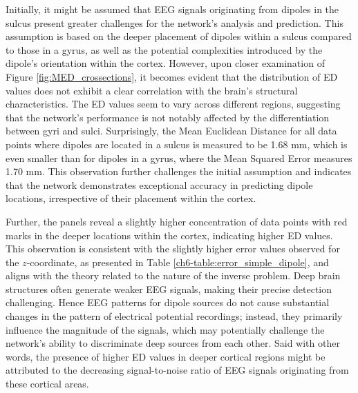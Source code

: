 \documentclass[a4paper, UKenglish, 11pt]{uiomaster}
\begin{document}
Initially, it might be assumed that EEG signals originating from dipoles in the sulcus present greater challenges for the network's analysis and prediction. This assumption is based on the deeper placement of dipoles within a sulcus compared to those in a gyrus, as well as the potential complexities introduced by the dipole's orientation within the cortex. However, upon closer examination of Figure \ref{fig:MED_crossections}, it becomes evident that the distribution of ED values does not exhibit a clear correlation with the brain's structural characteristics. The ED values seem to vary across different regions, suggesting that the network's performance is not notably affected by the differentiation between gyri and sulci. Surprisingly, the Mean Euclidean Distance for all data points where dipoles are located in a sulcus is measured to be 1.68 mm, which is even smaller than for dipoles in a gyrus, where the Mean Squared Error measures 1.70 mm. This observation further challenges the initial assumption and indicates that the network demonstrates exceptional accuracy in predicting dipole locations, irrespective of their placement within the cortex.


Further, the panels reveal a slightly higher concentration of data points with red marks in the deeper locations within the cortex, indicating higher ED values. This observation is consistent with the slightly higher error values observed for the $z$-coordinate, as presented in Table \ref{ch6-table:error_simple_dipole}, and aligns with the theory related to the nature of the inverse problem. Deep brain structures often generate weaker EEG signals, making their precise detection challenging. Hence EEG patterns for dipole sources do not cause substantial changes in the pattern of electrical potential recordings; instead, they primarily influence the magnitude of the signals, which may potentially challenge the network's ability to discriminate deep sources from each other. Said with other words, the presence of higher ED values in deeper cortical regions might be attributed to the decreasing signal-to-noise ratio of EEG signals originating from these cortical areas.
\end{document}
